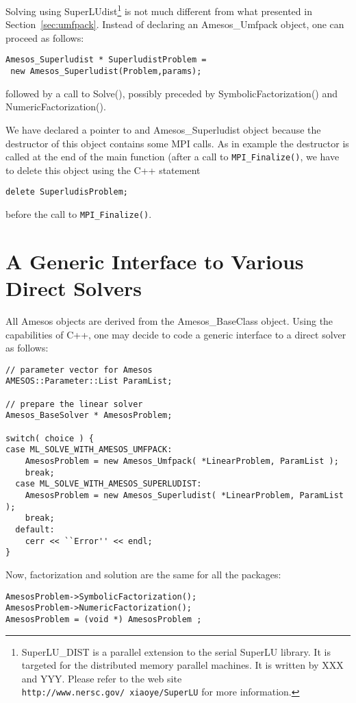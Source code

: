 Solving using SuperLUdist\footnote{SuperLU\_DIST is a parallel extension
  to the  serial SuperLU library.   It  is targeted for the  distributed
  memory parallel  machines. It is written  by XXX and YYY. Please refer
  to  the  web site {\tt  http://www.nersc.gov/~xiaoye/SuperLU} for more
  information.}  is not   much  different    from  what presented     in
Section~\ref{sec:umfpack}.    Instead of   declaring  an Amesos\_Umfpack
object, one can proceed as follows:
\begin{verbatim}
Amesos_Superludist * SuperludistProblem = 
 new Amesos_Superludist(Problem,params);
\end{verbatim}
followed by a call to Solve(), possibly preceded by
SymbolicFactorization() and NumericFactorization().

\begin{remark}
  We have declared a pointer to and Amesos\_Superludist object because
  the destructor of this object contains some MPI
  calls. As in example  the destructor is called
  at the end of the main function (after a call to
  \verb!MPI_Finalize()!, we have to delete this object using the C++
  statement
\begin{verbatim}
delete SuperludisProblem;
\end{verbatim}
  before the call to \verb!MPI_Finalize()!.
\end{remark}


\section{A Generic Interface to Various Direct Solvers}
\label{sec:amesos_generic}

All Amesos objects are derived from the Amesos\_BaseClass object. Using
the capabilities of C++, one may decide to code a generic interface to a
direct solver as follows:
\begin{verbatim}
// parameter vector for Amesos
AMESOS::Parameter::List ParamList;

// prepare the linear solver
Amesos_BaseSolver * AmesosProblem;

switch( choice ) {
case ML_SOLVE_WITH_AMESOS_UMFPACK:
    AmesosProblem = new Amesos_Umfpack( *LinearProblem, ParamList );
    break;
  case ML_SOLVE_WITH_AMESOS_SUPERLUDIST:
    AmesosProblem = new Amesos_Superludist( *LinearProblem, ParamList );
    break;
  default:
    cerr << ``Error'' << endl;
}
\end{verbatim}

Now, factorization and solution are the same for all the packages:
\begin{verbatim}  
AmesosProblem->SymbolicFactorization();
AmesosProblem->NumericFactorization();
AmesosProblem = (void *) AmesosProblem ;
\end{verbatim}


